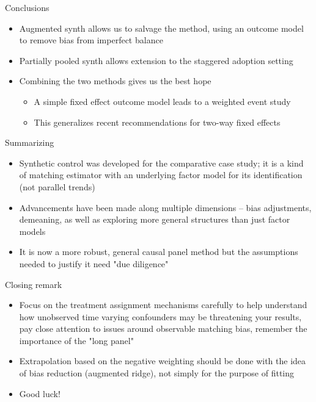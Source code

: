 \documentclass{beamer}
\begin{document}
\begin{frame}{Conclusions}

\begin{itemize}
\item Augmented synth allows us to salvage the method, using an outcome model to remove bias from imperfect balance
\item Partially pooled synth allows extension to the staggered adoption setting
\item Combining the two methods gives us the best hope 
	\begin{itemize}
	\item A simple fixed effect outcome model leads to a weighted event study
	\item This generalizes recent recommendations for two-way fixed effects
	\end{itemize}
\end{itemize}

\end{frame}








\begin{frame}{Summarizing}


\begin{itemize}

\item Synthetic control was developed for the comparative case study; it is a kind of matching estimator with an underlying factor model for its identification (not parallel trends)
\item Advancements have been made along multiple dimensions -- bias adjustments, demeaning, as well as exploring more general structures than just factor models
\item It is now a more robust, general causal panel method but the assumptions needed to justify it need "due diligence" 

\end{itemize}

\end{frame}

\begin{frame}{Closing remark}

\begin{itemize}
\item Focus on the treatment assignment mechanisms carefully to help understand how unobserved time varying confounders may be threatening your results, pay close attention to issues around observable matching bias, remember the importance of the "long panel"
\item Extrapolation based on the negative weighting should be done with the idea of bias reduction (augmented ridge), not simply for the purpose of fitting
\item Good luck!

\end{itemize}

\end{frame}
\end{document}
